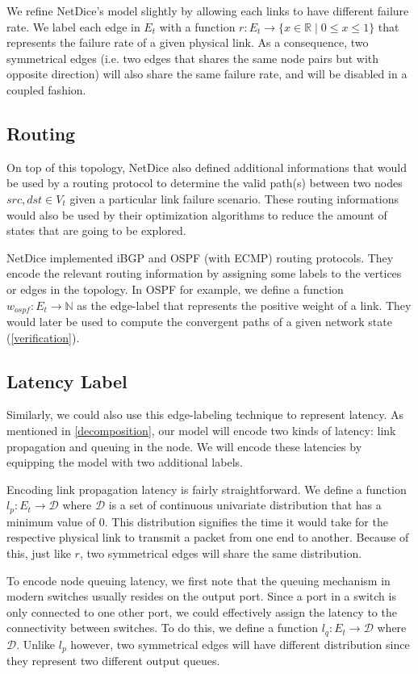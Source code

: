 \documentclass[10pt,sigconf,letterpaper,anonymous,nonacm]{acmart}
\begin{document}
We refine NetDice's model slightly by allowing each links to have different failure rate.
We label each edge in $E_t$ with a function $r: E_t \rightarrow \{x \in \mathbb{R} \mid 0 \le x 
\le 1\}$ that represents the failure rate of a given physical link.
As a consequence, two symmetrical edges (i.e. two edges that shares the same node pairs but with 
opposite direction) will also share the same failure rate, and will be disabled in a coupled 
fashion.

\subsection{Routing}
On top of this topology, NetDice also defined additional informations that would be used
by a routing protocol to determine the valid path(s) between two nodes $src, dst \in V_t$ given 
a particular link failure scenario. 
These routing informations would also be used by their optimization algorithms to reduce the 
amount of states that are going to be explored.

NetDice implemented iBGP and OSPF (with ECMP) routing protocols.
They encode the relevant routing information by assigning some labels to the vertices or edges
in the topology.
In OSPF for example, we define a function $w_{ospf}: E_t \rightarrow \mathbb{N}$ as the edge-label 
that represents the positive weight of a link.
They would later be used to compute the convergent paths of a given network state 
(\ref{verification}).

\subsection{Latency Label}
Similarly, we could also use this edge-labeling technique to represent latency. 
As mentioned in \ref{decomposition}, our model will encode two kinds of latency: link propagation 
and queuing in the node.
We will encode these latencies by equipping the model with two additional labels.

Encoding link propagation latency is fairly straightforward. 
We define a function $l_p: E_t \rightarrow \mathcal{D}$ where $\mathcal{D}$ is a set of 
continuous univariate distribution that has a minimum value of $0$.
This distribution signifies the time it would take for the respective physical link to transmit 
a packet from one end to another.
Because of this, just like $r$, two symmetrical edges will share the same distribution.

To encode node queuing latency, we first note that the queuing mechanism in modern switches 
usually resides on the output port. %
Since a port in a switch is only connected to one other port, we could effectively assign the 
latency to the connectivity between switches.
To do this, we define a function $l_q: E_t \rightarrow \mathcal{D}$ where $\mathcal{D}$.
Unlike $l_p$ however, two symmetrical edges will have different distribution since they 
represent two different output queues.
\end{document}
